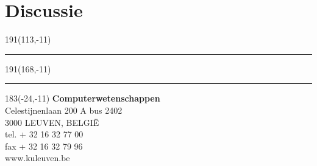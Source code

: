 \documentclass[12pt,a4paper,oneside]{book}
\begin{document}
\chapter{Discussie}





\newpage
\thispagestyle{empty}
\sffamily
%
\begin{textblock}{191}(113,-11)
{\color{blueline}\rule{160pt}{5.5pt}}
\end{textblock}
%
\begin{textblock}{191}(168,-11)
{\color{blueline}\rule{5.5pt}{59pt}}
\end{textblock}
%
\begin{textblock}{183}(-24,-11)
\textblockcolour{}
\flushright
\fontsize{7}{7.5}\selectfont
\textbf{Computerwetenschappen}\\
Celestijnenlaan 200 A bus 2402\\
3000 LEUVEN, BELGI\"{E}\\
tel. + 32 16 32 77 00\\
fax + 32 16 32 79 96\\
www.kuleuven.be\\
\end{textblock}
%
\end{document}
